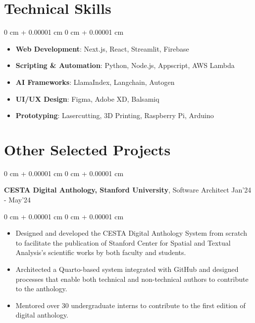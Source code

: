 \documentclass[10pt, letterpaper]{article}
\newenvironment{highlights}{
    \begin{itemize}[
        topsep=0.10 cm,
        parsep=0.10 cm,
        partopsep=0pt,
        itemsep=0pt,
        leftmargin=0 cm + 10pt
    ]
}{
    \end{itemize}
} %
\newenvironment{onecolentry}{
    \begin{adjustwidth}{
        0 cm + 0.00001 cm
    }{
        0 cm + 0.00001 cm
    }
}{
    \end{adjustwidth}
} %
\newenvironment{twocolentry}[2][]{
    \onecolentry
    \def\secondColumn{#2}
    \setcolumnwidth{\fill, 4.5 cm}
    \begin{paracol}{2}
}{
    \switchcolumn \raggedleft \secondColumn
    \end{paracol}
    \endonecolentry
} %
\newcommand{\datetext}[1]{\color{gray800}#1}
\newcommand{\socialimpactprojectentry}[3]{
    \begin{twocolentry}{
        \datetext{#3}
    }
        \textbf{#1}, #2\end{twocolentry}

    \vspace{0.10 cm}
}
\newcommand{\itemspacing}[1]{\vspace{0.275 cm}#1}
\begin{document}
    \section{Technical Skills}
        
    \begin{onecolentry}
        \begin{highlights}
            \item \textbf{Web Development}: Next.js, React, Streamlit, Firebase
            \item \textbf{Scripting \& Automation}: Python, Node.js, Appscript, AWS Lambda
            \item \textbf{AI Frameworks}: LlamaIndex, Langchain, Autogen            
            \item \textbf{UI/UX Design}: Figma, Adobe XD, Balsamiq
            \item \textbf{Prototyping}: Lasercutting, 3D Printing, Raspberry Pi, Arduino
        \end{highlights} 
    \end{onecolentry}

        
    \section{Other Selected Projects}

        \socialimpactprojectentry{CESTA Digital Anthology, Stanford University}{Software Architect}{Jan'24 - May'24}
            \begin{onecolentry}
                \begin{highlights}
                    \item  Designed and developed the CESTA Digital Anthology System from scratch to facilitate the publication of Stanford Center for Spatial and Textual Analysis's scientific works by both faculty and students.
                    \item Architected a Quarto-based system integrated with GitHub and designed processes that enable both technical and non-technical authors to contribute to the anthology.
                    \item Mentored over 30 undergraduate interns to contribute to the first edition of digital anthology.
                \end{highlights}
            \end{onecolentry}
        
        \itemspacing
        
\end{document}
